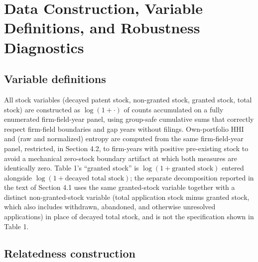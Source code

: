 \documentclass[12pt]{article}
\begin{document}
\appendix
\section{Data Construction, Variable Definitions, and Robustness Diagnostics}

\subsection{Variable definitions}

All stock variables (decayed patent stock, non-granted stock, granted stock, total stock) are constructed as $\log(1+\cdot)$ of counts accumulated on a fully enumerated firm-field-year panel, using group-safe cumulative sums that correctly respect firm-field boundaries and gap years without filings. Own-portfolio HHI and (raw and normalized) entropy are computed from the same firm-field-year panel, restricted, in Section 4.2, to firm-years with positive pre-existing stock to avoid a mechanical zero-stock boundary artifact at which both measures are identically zero. Table 1's ``granted stock'' is $\log(1+\text{granted stock})$ entered alongside $\log(1+\text{decayed total stock})$; the separate decomposition reported in the text of Section 4.1 uses the same granted-stock variable together with a distinct non-granted-stock variable (total application stock minus granted stock, which also includes withdrawn, abandoned, and otherwise unresolved applications) in place of decayed total stock, and is not the specification shown in Table 1.

\subsection{Relatedness construction}
\end{document}
